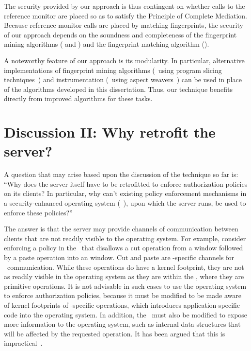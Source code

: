 The security provided by our approach is thus contingent on whether calls to
the reference monitor are placed so as to satisfy the Principle of Complete
Mediation. Because reference monitor calls are placed by matching fingerprints,
the security of our approach depends on the soundness and completeness of the
fingerprint mining algorithms ( and
) and the fingerprint matching algorithm
().

A noteworthy feature of our approach is its modularity. In particular,
alternative implementations of fingerprint mining algorithms (\eg~using program
slicing techniques~\cite{ah90,kr97,zg03}) and instrumentation (\eg~using aspect
weavers~\cite{aosd}) can be used in place of the algorithms developed in this
dissertation.  Thus, our technique benefits directly from improved algorithms
for these tasks.



\section{Discussion II: Why retrofit the server?}
\label{chapter:overview:discussion:why-retrofit-the-server}

A question that may arise based upon the discussion of the technique so far is:
``Why does the server itself have to be retrofitted to enforce authorization
policies on its clients? In particular, why can't existing policy enforcement
mechanisms in a security-enhanced operating system (\eg~\selinux), upon which
the server runs, be used to enforce these policies?'' 

The answer is that the server may provide channels of communication between
clients that are not readily visible to the operating system. For example,
consider enforcing a policy in the \xserver\ that disallows a cut operation
from a  window followed by a paste operation into an
 window. Cut and paste are \xserver-specific channels for
\xclient\ communication. While these operations do have a kernel footprint,
they are not as readily visible in the operating system as they are within the
\xserver, where they are primitive operations. It is not advisable in such
cases to use the operating system to enforce authorization policies, because it
must be modified to be made aware of kernel footprints of \xserver-specific
operations, which introduces application-specific code into the operating
system. In addition, the \xserver\ must also be modified to expose more
information to the operating system, such as internal data structures that will
be affected by the requested operation. It has been argued that this is
impractical~\cite{ksv03}.
